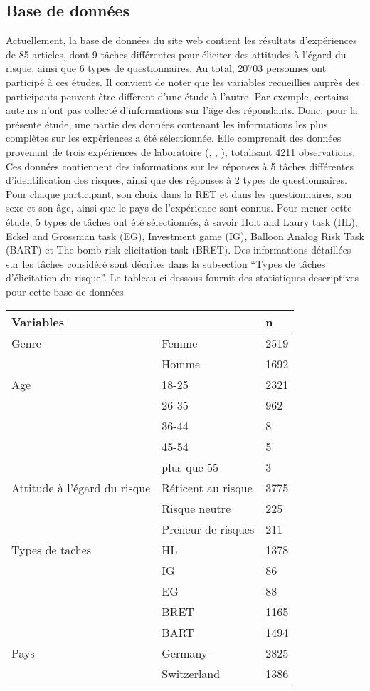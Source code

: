 \documentclass[12pt]{article}
\begin{document}
\subsection{Base de données}

Actuellement, la base de données du site web contient les résultats
d'expériences de 85 articles, dont 9 tâches différentes pour éliciter
des attitudes à l'égard du risque, ainsi que 6 types de questionnaires.
Au total, 20703 personnes ont participé à ces études. Il convient de
noter que les variables recueillies auprès des participants peuvent être
diffèrent d'une étude à l'autre. Par exemple, certains auteurs n'ont pas
collecté d'informations sur l'âge des répondants. Donc, pour la présente
étude, une partie des données contenant les informations les plus
complètes sur les expériences a été sélectionnée. Elle comprenait des
données provenant de trois expériences de laboratoire
(\citet{Crosetto2013}, \citet{Crosetto2016}, \citet{Frey2017}),
totalisant 4211 observations. Ces données contiennent des informations
sur les réponses à 5 tâches différentes d'identification des risques,
ainsi que des réponses à 2 types de questionnaires. Pour chaque
participant, son choix dans la RET et dans les questionnaires, son sexe
et son âge, ainsi que le pays de l'expérience sont connus. Pour mener
cette étude, 5 types de tâches ont été sélectionnés, à savoir Holt and
Laury task (HL), Eckel and Grossman task (EG), Investment game (IG),
Balloon Analog Risk Task (BART) et The bomb risk elicitation task
(BRET). Des informations détaillées sur les tâches considéré sont
décrites dans la subsection ``Types de tâches d'élicitation du risque''.
Le tableau ci-dessous fournit des statistiques descriptives pour cette
base de données.

\begin{longtable}[]{@{}lll@{}}
\toprule
Variables & & n \\
\midrule
\endhead
Genre & Femme & 2519 \\
& Homme & 1692 \\
Age & 18-25 & 2321 \\
& 26-35 & 962 \\
& 36-44 & 8 \\
& 45-54 & 5 \\
& plus que 55 & 3 \\
Attitude à l'égard du risque & Réticent au risque & 3775 \\
& Risque neutre & 225 \\
& Preneur de risques & 211 \\
Types de taches & HL & 1378 \\
& IG & 86 \\
& EG & 88 \\
& BRET & 1165 \\
& BART & 1494 \\
Pays & Germany & 2825 \\
& Switzerland & 1386 \\
\bottomrule
\end{longtable}
\end{document}
